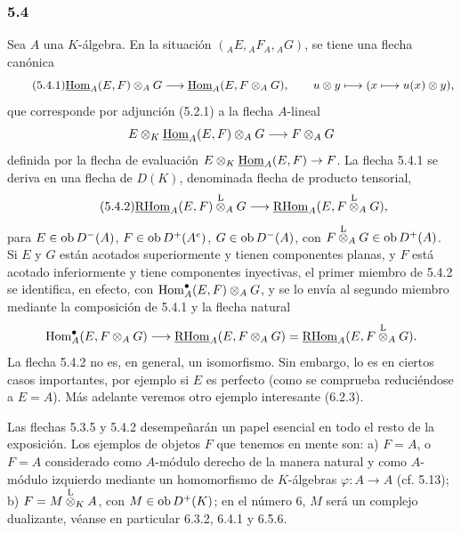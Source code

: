 \subsubsection*{5.4}

Sea $A$ una $K$-álgebra. En la situación $({}_AE,{}_AF_A,{}_AG)$, se tiene una flecha canónica
\begin{equation}\tag{5.4.1}
\underline{\operatorname{Hom}}_A(E,F)\otimes_AG\longrightarrow\underline{\operatorname{Hom}}_A(E,F\otimes_AG),
\qquad u\otimes y\longmapsto(x\longmapsto u(x)\otimes y),
\end{equation}
que corresponde por adjunción (5.2.1) a la flecha $A$-lineal
\[
E\otimes_K\underline{\operatorname{Hom}}_A(E,F)\otimes_AG\longrightarrow F\otimes_AG
\]
definida por la flecha de evaluación $E\otimes_K\underline{\operatorname{Hom}}_A(E,F)\to F$. La flecha 5.4.1 se deriva en una flecha de $D(K)$, denominada flecha de producto tensorial,
\begin{equation}\tag{5.4.2}
\underline{\mathrm{RHom}}_A(E,F)\overset{\mathrm L}{\otimes}_AG\longrightarrow\underline{\mathrm{RHom}}_A(E,F\overset{\mathrm L}{\otimes}_AG),
\end{equation}
para $E\in\operatorname{ob} D^-(A)$, $F\in\operatorname{ob} D^+(A^e)$, $G\in\operatorname{ob} D^-(A)$, con $F\overset{\mathrm L}{\otimes}_AG\in\operatorname{ob} D^+(A)$. Si $E$ y $G$ están acotados superiormente y tienen componentes planas, y $F$ está acotado inferiormente y tiene componentes inyectivas, el primer miembro de 5.4.2 se identifica, en efecto, con $\operatorname{Hom}_A^\bullet(E,F)\otimes_AG$, y se lo envía al segundo miembro mediante la composición de 5.4.1 y la flecha natural
\[
\operatorname{Hom}_A^\bullet(E,F\otimes_AG)\longrightarrow \underline{\mathrm{RHom}}_A(E,F\otimes_AG)=\underline{\mathrm{RHom}}_A(E,F\overset{\mathrm L}{\otimes}_AG).
\]
La flecha 5.4.2 no es, en general, un isomorfismo. Sin embargo, lo es en ciertos casos importantes, por ejemplo si $E$ es perfecto (como se comprueba reduciéndose a $E=A$). Más adelante veremos otro ejemplo interesante (6.2.3).

Las flechas 5.3.5 y 5.4.2 desempeñarán un papel esencial en todo el resto de la exposición. Los ejemplos de objetos $F$ que tenemos en mente son: a) $F=A$, o $F=A$ considerado como $A$-módulo derecho de la manera natural y como $A$-módulo izquierdo mediante un homomorfismo de $K$-álgebras $\varphi:A\to A$ (cf. 5.13); b) $F=M\overset{\mathrm L}{\otimes}_KA$, con $M\in\operatorname{ob} D^+(K)$; en el número 6, $M$ será un complejo dualizante, véanse en particular 6.3.2, 6.4.1 y 6.5.6.
